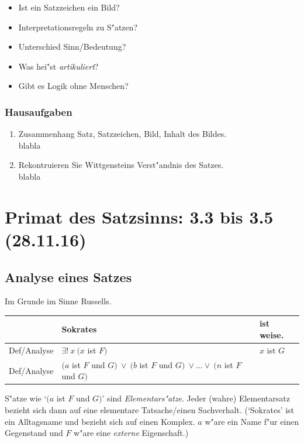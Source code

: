 \documentclass[emulatestandardclasses]{scrartcl}
\begin{document}
\begin{itemize}
  \item Ist ein Satzzeichen ein Bild?
  \item Interpretationsregeln zu S"atzen?
  \item Unterschied Sinn/Bedeutung?
  \item Was hei"st \emph{artikuliert}?
  \item Gibt es Logik ohne Menschen?
\end{itemize}

\subsubsection{Hausaufgaben}

\begin{enumerate}
  \item {\color{NavyBlue}Zusammenhang Satz, Satzzeichen, Bild, Inhalt des Bildes.}\\
{\color{ForestGreen} blabla}
  \item {\color{NavyBlue} Rekontruieren Sie Wittgensteins Verst"andnis des Satzes.}\\
{\color{ForestGreen} blabla}
\end{enumerate}


\section{Primat des Satzsinns: 3.3 bis 3.5\\(28.11.16)}


\subsection{Analyse eines Satzes}

Im Grunde im Sinne Russells.

\begin{center}
    \begin{tabular}{ l| l | l }
     & \textbf{Sokrates} & \textbf{ist weise.}\\ \hline
    Def/Analyse & $\exists !~x~(x$ ist $F)$ & $x$ ist $G$  \\
    Def/Analyse & $(a$ ist $F$ und $G)~\vee~(b$ ist $F$ und $G)~\vee ... \vee~(n$ ist $F$ und $G)$ 
    \end{tabular}
\end{center}

S"atze wie `$(a$ ist $F$ und $G)$' sind \emph{Elementars"atze}. Jeder (wahre) Elementarsatz bezieht sich dann auf eine elementare Tatsache/einen Sachverhalt. (`Sokrates' ist ein Alltagsname und bezieht sich auf einen Komplex. $a$ w"are ein Name f"ur einen Gegenstand und $F$ w"are eine \emph{externe} Eigenschaft.)
\end{document}
